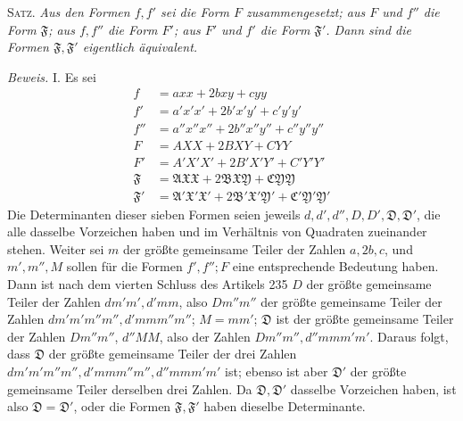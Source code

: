 \textsc{Satz.} \textit{Aus den Formen $f,f'$ sei die Form $F$ zusammengesetzt; aus $F$ und $f''$ die Form $\mathfrak{F}$; aus $f,f''$ die Form $F'$; aus $F'$ und $f'$ die Form $\mathfrak{F}'$. Dann sind die Formen $\mathfrak{F},\mathfrak{F}'$ eigentlich äquivalent.}

\textit{Beweis.} I. Es sei
\[
\begin{aligned}
f&=axx+2bxy+cyy\\
f'&=a'x'x'+2b'x'y'+c'y'y'\\
f''&=a''x''x''+2b''x''y''+c''y''y''\\
F&=AXX+2BXY+CYY\\
F'&=A'X'X'+2B'X'Y'+C'Y'Y'\\
\mathfrak{F}&=\mathfrak{A}\mathfrak{X}\mathfrak{X}+2\mathfrak{B}\mathfrak{X}\mathfrak{Y}+\mathfrak{C}\mathfrak{Y}\mathfrak{Y}\\
\mathfrak{F}'&=\mathfrak{A}'\mathfrak{X}'\mathfrak{X}'+2\mathfrak{B}'\mathfrak{X}'\mathfrak{Y}'+\mathfrak{C}'\mathfrak{Y}'\mathfrak{Y}'
\end{aligned}
\]
Die Determinanten dieser sieben Formen seien jeweils $d,d',d'',D,D',\mathfrak{D},\mathfrak{D}'$, die alle dasselbe Vorzeichen haben und im Verhältnis von Quadraten zueinander stehen. Weiter sei $m$ der größte gemeinsame Teiler der Zahlen $a,2b,c$, und $m',m'',M$ sollen für die Formen $f',f'';F$ eine entsprechende Bedeutung haben. Dann ist nach dem vierten Schluss des Artikels 235 $D$ der größte gemeinsame Teiler der Zahlen $dm'm',d'mm$, also $Dm''m''$ der größte gemeinsame Teiler der Zahlen $dm'm'm''m'',d'mmm''m''$; $M=mm'$; $\mathfrak{D}$ ist der größte gemeinsame Teiler der Zahlen $Dm''m''$, $d''MM$, also der Zahlen $Dm''m'',d''mmm'm'$. Daraus folgt, dass $\mathfrak{D}$ der größte gemeinsame Teiler der drei Zahlen $dm'm'm''m'',d'mmm''m'',d''mmm'm'$ ist; ebenso ist aber $\mathfrak{D}'$ der größte gemeinsame Teiler derselben drei Zahlen. Da $\mathfrak{D},\mathfrak{D}'$ dasselbe Vorzeichen haben, ist also $\mathfrak{D}=\mathfrak{D}'$, oder die Formen $\mathfrak{F},\mathfrak{F}'$ haben dieselbe Determinante.

